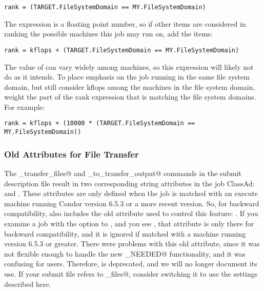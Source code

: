 \begin{verbatim}
rank = (TARGET.FileSystemDomain == MY.FileSystemDomain)
\end{verbatim}

The  expression is a floating point number, so if 
other items are considered in ranking the possible machines this job
may run on, add the items:

\begin{verbatim}
rank = kflops + (TARGET.FileSystemDomain == MY.FileSystemDomain)
\end{verbatim}

The value of  can vary widely among machines,
so this  expression will likely not do as it intends.
To place emphasis on the job running in the same file
system domain,
but still consider kflops among the machines in the file system domain,
weight the part of the rank expression that is matching the file system domains.
For example: 

\begin{verbatim}
rank = kflops + (10000 * (TARGET.FileSystemDomain == MY.FileSystemDomain))
\end{verbatim}

\subsubsection{Old Attributes for File Transfer}

The \verb@should_transfer_files@ and \verb@when_to_transfer_output@
commands in the submit description file result in two corresponding string
attributes in the job ClassAd:  and
.
These attributes are only defined when the job is matched with an
execute machine running Condor version 6.5.3 or a more recent version.
So, for backward compatibility,  also includes the old
attribute used to control this feature: .
If you examine a job with the  option to , and
you see , that attribute is only there for
backward compatibility, and it is ignored if matched with a machine
running version 6.5.3 or greater.  
There were problems with this old attribute, since it
was not flexible enough to handle the new \verb@IF_NEEDED@
functionality, and it was confusing for users.
Therefore,  is deprecated, and we will no longer
document its use.
If your submit file refers to \verb@transfer_files@,
consider switching it to use the settings described here.


